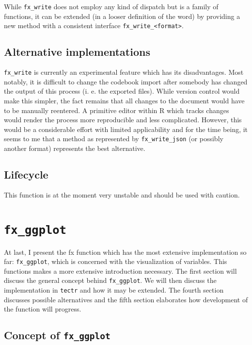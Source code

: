 \documentclass[]{report}
\theoremstyle{definition}
\theoremstyle{definition}
\theoremstyle{definition}
\theoremstyle{remark}
\begin{document}
While \texttt{fx\_write} does not employ any kind of dispatch but is a
family of functions, it can be extended (in a looser definition of the
word) by providing a new method with a consistent interface
\texttt{fx\_write\_\textless{}format\textgreater{}}.

\subsection{Alternative
implementations}\label{alternative-implementations-1}

\texttt{fx\_write} is currently an experimental feature which has its
disadvantages. Most notably, it is difficult to change the codebook
import after somebody has changed the output of this process (i. e. the
exported files). While version control would make this simpler, the fact
remains that all changes to the document would have to be manually
reentered. A primitive editor within R which tracks changes would render
the process more reproducible and less complicated. However, this would
be a considerable effort with limited applicability and for the time
being, it seems to me that a method as represented by
\texttt{fx\_write\_json} (or possibly another format) represents the
best alternative.

\subsection{Lifecycle}\label{lifecycle-3}

This function is at the moment very unstable and should be used with
caution.

\section{\texorpdfstring{\texttt{fx\_ggplot}}{fx\_ggplot}}\label{fx-ggplot}

At last, I present the fx function which has the most extensive
implementation so far: \texttt{fx\_ggplot}, which is concerned with the
visualization of variables. This functions makes a more extensive
introduction necessary. The first section will discuss the general
concept behind \texttt{fx\_ggplot}. We will then discuss the
implementation in \texttt{tectr} and how it may be extended. The fourth
section discusses possible alternatives and the fifth section elaborates
how development of the function will progress.

\subsection{\texorpdfstring{Concept of
\texttt{fx\_ggplot}}{Concept of fx\_ggplot}}\label{concept-of-fx_ggplot}
\end{document}
